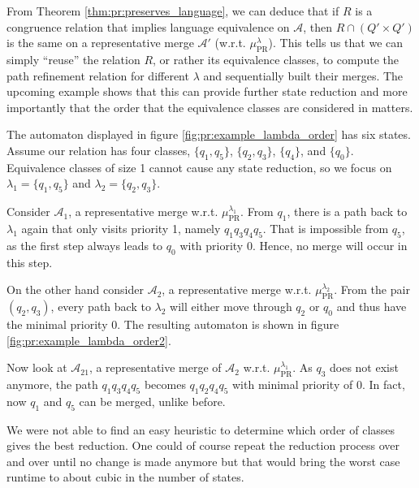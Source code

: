 From Theorem \ref{thm:pr:preserves_language}, we can deduce that if $R$ is a congruence relation that implies language equivalence on $\mathcal{A}$, then $R \cap (Q' \times Q')$ is the same on a representative merge $\mathcal{A}'$ (w.r.t. $\mu_\text{PR}^\lambda$). This tells us that we can simply \enquote{reuse} the relation $R$, or rather its equivalence classes, to compute the path refinement relation for different $\lambda$ and sequentially built their merges. The upcoming example shows that this can provide further state reduction and more importantly that the order that the equivalence classes are considered in matters.

The automaton displayed in figure \ref{fig:pr:example_lambda_order} has six states. Assume our relation has four classes, $\{q_1, q_5\}$, $\{q_2, q_3\}$, $\{q_4\}$, and $\{q_0\}$. Equivalence classes of size 1 cannot cause any state reduction, so we focus on $\lambda_1 = \{q_1, q_5\}$ and $\lambda_2 = \{q_2, q_3\}$.

Consider $\mathcal{A}_1$, a representative merge w.r.t. $\mu_\text{PR}^{\lambda_1}$. From $q_1$, there is a path back to $\lambda_1$ again that only visits priority 1, namely $q_1 q_3 q_4 q_5$. That is impossible from $q_5$, as the first step always leads to $q_0$ with priority 0. Hence, no merge will occur in this step.

On the other hand consider $\mathcal{A}_2$, a representative merge w.r.t. $\mu_\text{PR}^{\lambda_2}$. From the pair $(q_2, q_3)$, every path back to $\lambda_2$ will either move through $q_2$ or $q_0$ and thus have the minimal priority 0. The resulting automaton is shown in figure \ref{fig:pr:example_lambda_order2}.

Now look at $\mathcal{A}_{21}$, a representative merge of $\mathcal{A}_2$ w.r.t. $\mu_\text{PR}^{\lambda_1}$. As $q_3$ does not exist anymore, the path $q_1 q_3 q_4 q_5$ becomes $q_1 q_2 q_4 q_5$ with minimal priority of 0. In fact, now $q_1$ and $q_5$ can be merged, unlike before.

We were not able to find an easy heuristic to determine which order of classes gives the best reduction. One could of course repeat the reduction process over and over until no change is made anymore but that would bring the worst case runtime to about cubic in the number of states.


